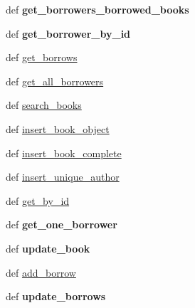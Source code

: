\begin{DoxyCompactItemize}
\item 
\hypertarget{classsrc_1_1db__queries_1_1sqlite_ae41fd3648326c1b44b2f0d0da983b3cd}{
def {\bfseries get\_\-borrowers\_\-borrowed\_\-books}}
\label{classsrc_1_1db__queries_1_1sqlite_ae41fd3648326c1b44b2f0d0da983b3cd}

\item 
\hypertarget{classsrc_1_1db__queries_1_1sqlite_aeff969689ee9a788041e61de54251d59}{
def {\bfseries get\_\-borrower\_\-by\_\-id}}
\label{classsrc_1_1db__queries_1_1sqlite_aeff969689ee9a788041e61de54251d59}

\item 
def \hyperlink{classsrc_1_1db__queries_1_1sqlite_a63ab71d64fda1235b3556b3956b31cdc}{get\_\-borrows}
\item 
def \hyperlink{classsrc_1_1db__queries_1_1sqlite_a926cc2ce60c5e7c2df548c9123732561}{get\_\-all\_\-borrowers}
\item 
def \hyperlink{classsrc_1_1db__queries_1_1sqlite_aef554970f084d1bc7d9a70eff784e9c0}{search\_\-books}
\item 
def \hyperlink{classsrc_1_1db__queries_1_1sqlite_a3ff8c6fd0beb11afd7065d23952febe1}{insert\_\-book\_\-object}
\item 
def \hyperlink{classsrc_1_1db__queries_1_1sqlite_a217ec37ce32643fa3b0664dbcefc7cd2}{insert\_\-book\_\-complete}
\item 
def \hyperlink{classsrc_1_1db__queries_1_1sqlite_af14376c653f816e1066d2f4a4359cb9d}{insert\_\-unique\_\-author}
\item 
def \hyperlink{classsrc_1_1db__queries_1_1sqlite_a6abb493897bfea05cc3ad22070c0926a}{get\_\-by\_\-id}
\item 
\hypertarget{classsrc_1_1db__queries_1_1sqlite_a19d5f4150b8277c950498747d8e0cab1}{
def {\bfseries get\_\-one\_\-borrower}}
\label{classsrc_1_1db__queries_1_1sqlite_a19d5f4150b8277c950498747d8e0cab1}

\item 
\hypertarget{classsrc_1_1db__queries_1_1sqlite_a23c2e089c440d0a2d373d8bc3f50ffaa}{
def {\bfseries update\_\-book}}
\label{classsrc_1_1db__queries_1_1sqlite_a23c2e089c440d0a2d373d8bc3f50ffaa}

\item 
def \hyperlink{classsrc_1_1db__queries_1_1sqlite_a4c430faeb749412d9b7bb11a0e634fd6}{add\_\-borrow}
\item 
\hypertarget{classsrc_1_1db__queries_1_1sqlite_af40ba3a88385ea7c895be035be090acd}{
def {\bfseries update\_\-borrows}}
\label{classsrc_1_1db__queries_1_1sqlite_af40ba3a88385ea7c895be035be090acd}


\end{DoxyCompactItemize}

